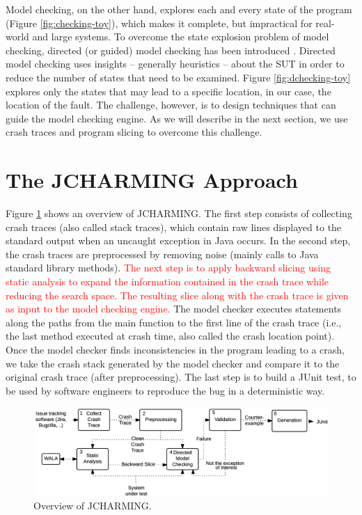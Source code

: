 \documentclass[times, doublespace]{smrauth}
\newcommand{\red}[1]{\textcolor{red}{#1}}
\begin{document}
Model checking, on the other hand, explores each and every state of the program
(Figure \ref{fig:checking-toy}), which makes it complete, but impractical for
real-world and large systems. To overcome the state explosion problem of
model checking, directed (or guided) model checking has been introduced
\cite{Edelkamp2004, Edelkamp2009}. Directed model checking uses insights -- generally
heuristics -- about the SUT in order to reduce the number of states
that need to be examined. Figure \ref{fig:dchecking-toy} explores only
the states that may lead to a specific location, in our case, the
location of the fault. The challenge, however, is to design techniques that
can guide the model checking engine. As we will describe in the next section,
we use crash traces and program slicing to overcome this challenge.

\section{The JCHARMING Approach\label{sec:jcharming}}

Figure \ref{fig:jcarming-approach} shows an overview of JCHARMING. The first step
consists of collecting crash traces (also called stack traces), which contain raw lines
displayed to the standard output when an uncaught exception
in Java occurs. In the second step, the crash traces are
preprocessed by removing noise (mainly calls to Java standard
library methods). \red{The next step is to apply backward slicing
using static analysis to expand the information contained in
the crash trace while reducing the search space. The resulting
slice along with the crash trace is given as input to the model
checking engine.} The model checker executes statements
along the paths from the main function to the first line of the
crash trace (i.e., the last method executed at crash time, also
called the crash location point). Once the model checker finds
inconsistencies in the program leading to a crash, we take the
crash stack generated by the model checker and compare it to
the original crash trace (after preprocessing). The last step is
to build a JUnit test, to be used by software engineers to
reproduce the bug in a deterministic way.

\begin{figure}
  \centering
    \includegraphics[scale=0.8]{media/jcharming-approach.png}
    \caption{Overview of JCHARMING.
    \label{fig:jcarming-approach}}
\end{figure}
\end{document}
